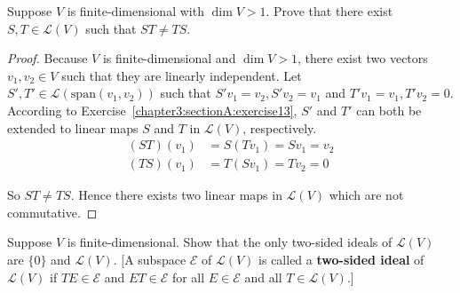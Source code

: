 \begin{exercise}
    Suppose $V$ is finite-dimensional with $\dim V > 1$. Prove that there exist $S, T \in \mathcal{L}(V)$ such that $ST \ne TS$.
\end{exercise}

\begin{proof}
    Because $V$ is finite-dimensional and $\dim V > 1$, there exist two vectors $v_{1}, v_{2}\in V$ such that they are linearly independent. Let $S', T'\in\mathcal{L}(\text{span}(v_{1}, v_{2}))$ such that $S'v_{1} = v_{2}, S'v_{2} = v_{1}$ and $T'v_{1} = v_{1}, T'v_{2} = 0$. According to Exercise~\ref{chapter3:sectionA:exercise13}, $S'$ and $T'$ can both be extended to linear maps $S$ and $T$ in $\mathcal{L}(V)$, respectively.
    \begin{align*}
        (ST)(v_{1}) & = S(Tv_{1}) = Sv_{1} = v_{2} \\
        (TS)(v_{1}) & = T(Sv_{1}) = Tv_{2} = 0
    \end{align*}

    So $ST\ne TS$. Hence there exists two linear maps in $\mathcal{L}(V)$ which are not commutative.
\end{proof}
\newpage

\begin{exercise}\label{chapter3:sectionA:exercise17}
    Suppose $V$ is finite-dimensional. Show that the only two-sided ideals of $\mathcal{L}(V)$ are $\{0\}$ and $\mathcal{L}(V)$.
        [A subspace $\mathcal{E}$ of $\mathcal{L}(V)$ is called a \textbf{two-sided ideal} of $\mathcal{L}(V)$ if $TE \in \mathcal{E}$ and $ET \in \mathcal{E}$ for all $E \in \mathcal{E}$ and all $T \in \mathcal{L}(V)$.]
\end{exercise}

